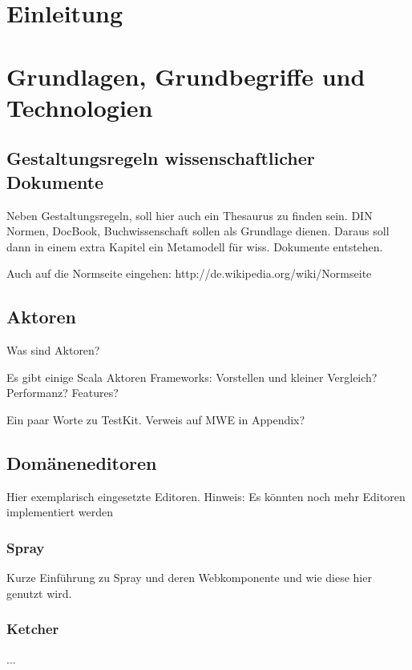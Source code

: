 \chapter{Einleitung}


\chapter{Grundlagen, Grundbegriffe und Technologien}


\section{Gestaltungsregeln wissenschaftlicher Dokumente}

Neben Gestaltungsregeln, soll hier auch ein Thesaurus zu finden sein.
DIN Normen, DocBook, Buchwissenschaft sollen als Grundlage dienen.
Daraus soll dann in einem extra Kapitel ein Metamodell für wiss. Dokumente
entstehen.

Auch auf die Normseite eingehen: http://de.wikipedia.org/wiki/Normseite


\section{Aktoren}

Was sind Aktoren?

Es gibt einige Scala Aktoren Frameworks: Vorstellen und kleiner Vergleich?
Performanz? Features?

Ein paar Worte zu TestKit. Verweis auf MWE in Appendix?


\section{Domäneneditoren}

Hier exemplarisch eingesetzte Editoren. Hinweis: Es könnten noch mehr
Editoren implementiert werden

\subsection{Spray}

Kurze Einführung zu Spray und deren Webkomponente und wie diese hier genutzt
wird.

\subsection{Ketcher}

...


